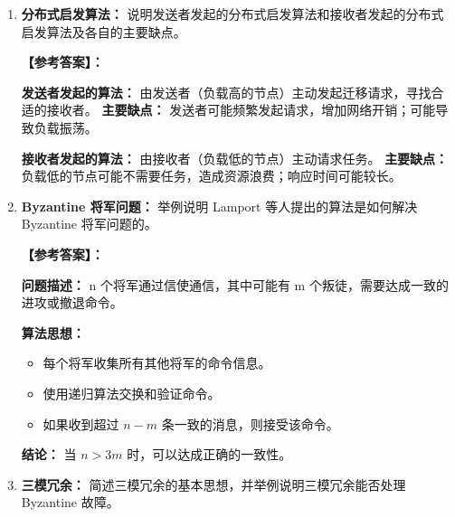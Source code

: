 \documentclass[a4paper,12pt]{article}
\newcommand{\answer}[1]{\par\vspace{0.5em}\hspace{2em}\textbf{【参考答案】：}\\{\color{blue}#1}\par\vspace{1em}}
\begin{document}
\begin{enumerate}[label=\arabic*.]
    \answer{
    \textbf{1. 在用户空间实现线程：} 是将线程包完全放到用户空间中去，内核对此一无所知。
    \textbf{优点：} 在不支持线程的操作系统中实现；线程切换比使用内核陷阱快一个数量级；允许每个进程有自己定制的调度算法。
    \textbf{缺点：} 阻塞调用难以实现；需要将系统调用改为非阻塞（如使用 SELECT）；需要使用旋转锁和信号中断来实现调度。
    
    \textbf{2. 在内核中实现线程：} 当线程创建或撤销时发出内核调用，由内核完成工作。内核中每个进程都有一张包含线程信息的表。
    \textbf{优点：} 容易实现调度。
    \textbf{缺点：} 系统开销大。
    
    \textbf{3. 调度者行为：} 内核分配一定数量的虚拟处理机给每个进程，让运行期系统将线程分配给处理机。
    \textbf{优点：} 效率高，很好地解决了控制权由阻塞线程传递给非阻塞线程的问题。
    \textbf{缺点：} 可能产生死锁，与分层系统的内在结构违背。
    }

    \item \textbf{分布式启发算法：}
    说明发送者发起的分布式启发算法和接收者发起的分布式启发算法及各自的主要缺点。
    
    \answer{
    \textbf{发送者发起的算法：} 由发送者（负载高的节点）主动发起迁移请求，寻找合适的接收者。
    \textbf{主要缺点：} 发送者可能频繁发起请求，增加网络开销；可能导致负载振荡。
    
    \textbf{接收者发起的算法：} 由接收者（负载低的节点）主动请求任务。
    \textbf{主要缺点：} 负载低的节点可能不需要任务，造成资源浪费；响应时间可能较长。
    }

    \item \textbf{Byzantine 将军问题：}
    举例说明 Lamport 等人提出的算法是如何解决 Byzantine 将军问题的。
    
    \answer{
    \textbf{问题描述：} n 个将军通过信使通信，其中可能有 m 个叛徒，需要达成一致的进攻或撤退命令。
    
    \textbf{算法思想：}
    \begin{itemize}
        \item 每个将军收集所有其他将军的命令信息。
        \item 使用递归算法交换和验证命令。
        \item 如果收到超过 $n-m$ 条一致的消息，则接受该命令。
    \end{itemize}
    
    \textbf{结论：} 当 $n > 3m$ 时，可以达成正确的一致性。
    }

    \item \textbf{三模冗余：}
    简述三模冗余的基本思想，并举例说明三模冗余能否处理 Byzantine 故障。
    

\end{enumerate}
\end{document}
